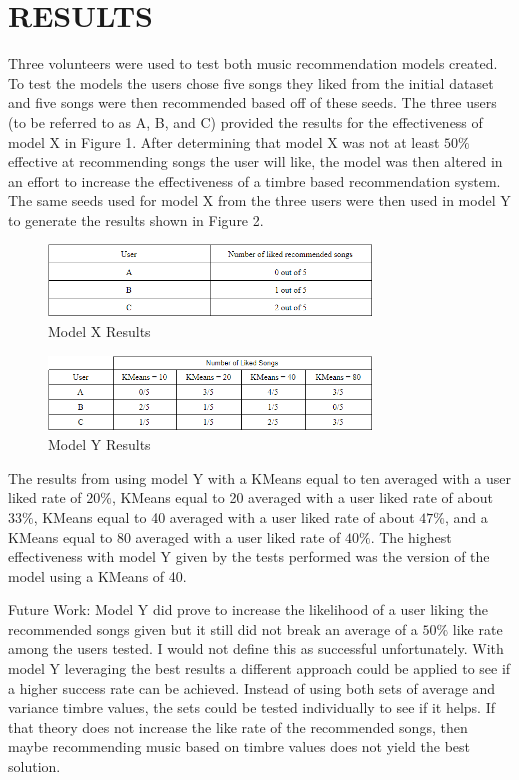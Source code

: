 \documentclass[letterpaper, 10 pt, conference]{ieeeconf}
\begin{document}

\section{RESULTS}
Three volunteers were used to test both music recommendation models created. To test the models the users chose five songs they liked from the initial dataset and five songs were then recommended based off of these seeds. The three users (to be referred to as A, B, and C) provided the results for the effectiveness of model X in Figure 1. After determining that model X was not at least $50\%$ effective at recommending songs the user will like, the model was then altered in an effort to increase the effectiveness of a timbre based recommendation system. The same seeds used for model X from the three users were then used in model Y to generate the results shown in Figure 2.

\begin{figure}[h]
        \centering
        \includegraphics[width=8.6cm]{modelX.png}
        \caption{Model X Results}
        \label{fig:ecnoc}
\end{figure}

\begin{figure}[h]
        \centering
        \includegraphics[width=8.6cm]{modelY.png}
        \caption{Model Y Results}
        \label{fig:ecnot}
\end{figure}

The results from using model Y with a KMeans equal to ten averaged with a user liked rate of $20\%$, KMeans equal to 20 averaged with a user liked rate of about $33\%$, KMeans equal to 40 averaged with a user liked rate of about $47\%$, and a KMeans equal to 80 averaged with a user liked rate of $40\%$. The highest effectiveness with model Y given by the tests performed was the version of the model using a KMeans of 40.

Future Work: Model Y did prove to increase the likelihood of a user liking the recommended songs given but it still did not break an average of a $50\%$ like rate among the users tested. I would not define this as successful unfortunately. With model Y leveraging the best results a different approach could be applied to see if a higher success rate can be achieved. Instead of using both sets of average and variance timbre values, the sets could be tested individually to see if it helps. If that theory does not increase the like rate of the recommended songs, then maybe recommending music based on timbre values does not yield the best solution.
\end{document}
